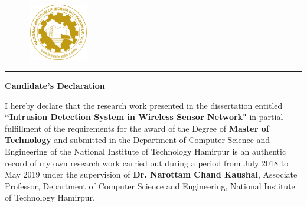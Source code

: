 \graphicspath{{Figures/PNG/}{Figures/}}
\vspace{-4.5\baselineskip}
\begin{figure}[htbp]
	\includegraphics[height=2.5cm,width=2.7cm]{NIT-Logo.png}
\end{figure}
\vspace{-5.0\baselineskip}
\begin{center} 
\end{center}
\noindent\rule{\linewidth}{2pt}
\begin{center}
{\bf\Large \hspace{1cm} Candidate's Declaration }\\
\par\vspace{5mm}
\end{center}
\noindent I hereby declare that the research work presented in the dissertation entitled \textbf{``Intrusion Detection System in Wireless Sensor Network"} in partial fulfillment of the requirements for the award of the Degree of \textbf{Master of Technology} and submitted in the Department of Computer Science and Engineering of the National Institute of Technology Hamirpur is an authentic record of my own research work carried out during a period from July 2018 to May 2019 under the supervision of  \textbf{Dr. Narottam Chand Kaushal}, Associate Professor, Department of Computer Science and Engineering, National Institute of Technology Hamirpur.
